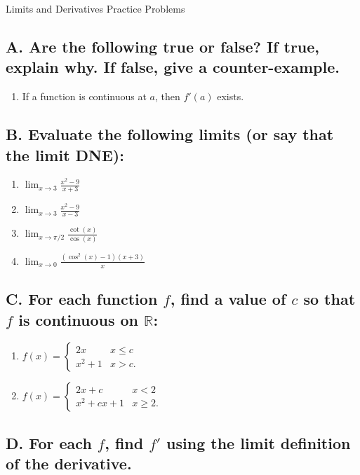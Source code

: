 \documentclass{article}
\begin{document}
\begin{center}
\begin{Huge}Limits and Derivatives Practice Problems\end{Huge}
\end{center}


\subsection*{A. Are the following true or false? If true, explain why. If false, give a counter-example.}
\begin{enumerate}
\item If a function is continuous at $a$, then $f'(a)$ exists.
\end{enumerate}


\subsection*{B. Evaluate the following limits (or say that the limit DNE):}

\begin{enumerate}
\item $\displaystyle\lim_{x\to 3}\frac{x^2-9}{x+3}$
\item $\displaystyle\lim_{x\to 3}\frac{x^2-9
   }{x-3}$
\item $\displaystyle\lim_{x\to \pi/2}\frac{\cot(x)}{\cos(x)}$
\item $\displaystyle\lim_{x\to 0}\frac{(\cos^2(x) - 1)(x+3)}{x}$
\end{enumerate}

\subsection*{C. For each function $f$, find a value of $c$ so that $f$ is continuous on $\mathbb{R}$:}

\begin{enumerate}
\item $f(x)=\begin{cases}2x & x \leq c \\ x^2+1 & x > c.\end{cases}$
\item $f(x)=\begin{cases}2x+c & x < 2 \\ x^2 + cx +1 & x \geq 2.\end{cases}$
\end{enumerate}

\subsection*{D. For each $f$, find $f'$ using the limit definition of the derivative.}
\end{document}
